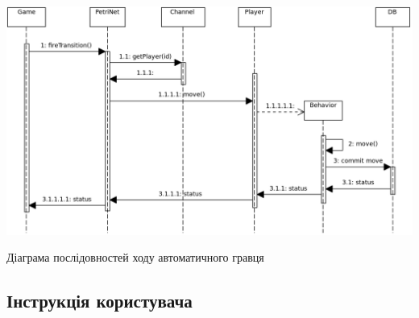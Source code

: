 \begin{stdfigure}
    \includegraphics[width=7in]{images/uml/automate_move.png}
    \caption{Діаграма послідовностей ходу автоматичного гравця}
    \label{fig:uml_auto_move}
\end{stdfigure}   
\subsection{Інструкція користувача}

